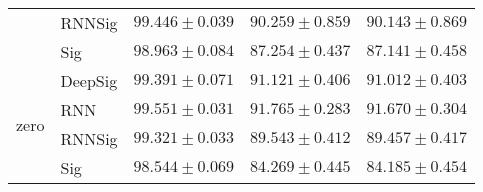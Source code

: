 \begin{tabular}{lllll}
                                 & RNNSig  &                           $ 99.446 \pm 0.039 $ &                           $ 90.259 \pm 0.859 $ &                           $ 90.143 \pm 0.869 $ \\
                                 & Sig     &                           $ 98.963 \pm 0.084 $ &                           $ 87.254 \pm 0.437 $ &                           $ 87.141 \pm 0.458 $ \\
\midrule
\multirow{4}{*}{zero}            & DeepSig &                           $ 99.391 \pm 0.071 $ &                           $ 91.121 \pm 0.406 $ &                           $ 91.012 \pm 0.403 $ \\
                                 & RNN     &                           $ 99.551 \pm 0.031 $ &                           $ 91.765 \pm 0.283 $ &                           $ 91.670 \pm 0.304 $ \\
                                 & RNNSig  &                           $ 99.321 \pm 0.033 $ &                           $ 89.543 \pm 0.412 $ &                           $ 89.457 \pm 0.417 $ \\
                                 & Sig     &                           $ 98.544 \pm 0.069 $ &                           $ 84.269 \pm 0.445 $ &                           $ 84.185 \pm 0.454 $ \\
\bottomrule
\end{tabular}
